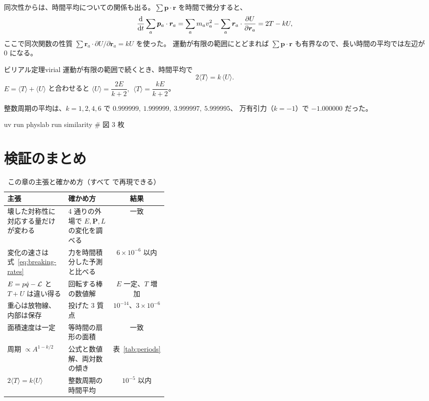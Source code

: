 同次性からは、時間平均についての関係も出る。$\sum\bm p\cdot\bm r$ を時間で微分すると、
\begin{equation}
  \frac{\mathrm{d} }{\mathrm{d} t}\sum_a\bm p_a\cdot\bm r_a=\sum_am_av_a^2-\sum_a\bm r_a\cdot\frac{\partial U}{\partial \bm r_a}=2T-kU,
\end{equation}
ここで同次関数の性質 $\sum\bm r_a\cdot\partial U/\partial\bm r_a=kU$ を使った。
運動が有限の範囲にとどまれば $\sum\bm p\cdot\bm r$ も有界なので、長い時間の平均では左辺が 0 になる。

\begin{result}{ビリアル定理}{virial}
運動が有限の範囲で続くとき、時間平均で
\begin{equation}
  2\langle T\rangle=k\,\langle U\rangle .
  \label{eq:virial}
\end{equation}
$E=\langle T\rangle+\langle U\rangle$ と合わせると
$\langle U\rangle=\dfrac{2E}{k+2},\ \ \langle T\rangle=\dfrac{kE}{k+2}$。
\end{result}


整数周期の平均は、$k=1,2,4,6$ で $0.999999,\ 1.999999,\ 3.999997,\ 5.999995$、
万有引力（$k=-1$）で $-1.000000$ だった。

\begin{simbox}
\begin{terminal}
uv run physlab run similarity      # 図 3 枚
\end{terminal}
\end{simbox}

\section{検証のまとめ}\label{sec:cons-check}

\begin{table}[htbp]
\centering
\caption{この章の主張と確かめ方（すべて  で再現できる）}\label{tab:cons-check}
\begin{tabularx}{\linewidth}{@{}>{\raggedright\arraybackslash}p{0.38\linewidth}Lc@{}}
\toprule
主張 & 確かめ方 & 結果 \\
\midrule
壊した対称性に対応する量だけが変わる & 4 通りの外場で $E,\bm P,L$ の変化を調べる & 一致 \\
変化の速さは式~\eqref{eq:breaking-rates} & 力を時間積分した予測と比べる & $6\times10^{-6}$ 以内 \\
$E=p\dot q-\mathcal{L}$ と $T+U$ は違い得る & 回転する棒の数値解 & $E$ 一定、$T$ 増加 \\
重心は放物線、内部は保存 & 投げた 3 質点 & $10^{-14}$、$3\times10^{-6}$ \\
面積速度は一定 & 等時間の扇形の面積 & 一致 \\
周期 $\propto A^{1-k/2}$ & 公式と数値解、両対数の傾き & 表~\ref{tab:periods} \\
$2\langle T\rangle=k\langle U\rangle$ & 整数周期の時間平均 & $10^{-5}$ 以内 \\
\bottomrule
\end{tabularx}
\end{table}

